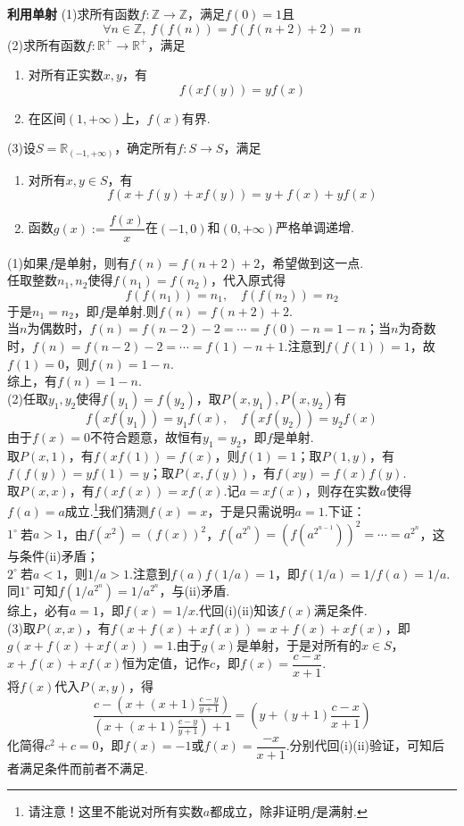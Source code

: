 \documentclass[lang=cn, zihao=5]{elegantbook}
\newcommand{\R}{\mathbb{R}}
\newcommand{\buzhou}[1]{$#1^{\circ} \ $}
\newcommand{\examplefont}[1]{\color{mgreen} \textbf{#1}}
\begin{document}
\begin{example}{\examplefont{利用单射}}
	(1)求所有函数$f:\mathbb{Z} \to \mathbb{Z}$，满足$f(0)=1$且$$\forall n \in \mathbb{Z},~ f(f(n))=f(f(n+2)+2)=n$$
	(2)求所有函数$f:\R^+ \to \R^+$，满足
	\begin{enumerate}
		\item 对所有正实数$x,y$，有$$f(xf(y))=yf(x)$$
		\item 在区间$(1,+\infty)$上，$f(x)$有界.
	\end{enumerate}
	(3)设$S=\R _{(-1,+\infty )}$，确定所有$f:S \to S$，满足
	\begin{enumerate}
		\item 对所有$x,y \in S$，有$$f(x+f(y)+xf(y))=y+f(x)+yf(x)$$
		\item 函数$g(x):=\dfrac{f(x)}{x}$在$(-1,0)$和$(0,+\infty)$严格单调递增.
	\end{enumerate}
\end{example}
\begin{solution}
	(1)如果$f$是单射，则有$f(n)=f(n+2)+2$，希望做到这一点. \\
	任取整数$n_1,n_2$使得$f(n_1)=f(n_2)$，代入原式得$$f(f(n_1))=n_1,\quad f(f(n_2))=n_2$$
	于是$n_1=n_2$，即$f$是单射.则$f(n)=f(n+2)+2$. \\
	当$n$为偶数时，$f(n)=f(n-2)-2=\cdots =f(0)-n=1-n$；当$n$为奇数时，$f(n)=f(n-2)-2=\cdots =f(1)-n+1$.注意到$f(f(1))=1$，故$f(1)=0$，则$f(n)=1-n$. \\
	综上，有$f(n)=1-n$. \\
	(2)任取$y_1,y_2$使得$f(y_1)=f(y_2)$，取$P(x,y_1),P(x,y_2)$有$$f(xf(y_1))=y_1f(x),\quad f(xf(y_2))=y_2f(x)$$
	由于$f(x)=0$不符合题意，故恒有$y_1=y_2$，即$f$是单射. \\
	取$P(x,1)$，有$f(xf(1))=f(x)$，则$f(1)=1$；取$P(1,y)$，有$f(f(y))=yf(1)=y$；取$P(x,f(y))$，有$f(xy)=f(x)f(y)$. \\
	取$P(x,x)$，有$f(xf(x))=xf(x)$.记$a=xf(x)$，则存在实数$a$使得$f(a)=a$成立.\footnote{请注意！这里不能说对所有实数$a$都成立，除非证明$f$是满射.}我们猜测$f(x)=x$，于是只需说明$a=1$.下证： \\
	\buzhou{1}若$a>1$，由$f(x^2)=(f(x))^2$，$f(a^{2^n})=(f(a^{2^{n-1}}))^2=\cdots = a^{2^n}$，这与条件(ii)矛盾； \\
	\buzhou{2}若$a<1$，则$1/a>1$.注意到$f(a)f(1/a)=1$，即$f(1/a)=1/f(a)=1/a$.同\buzhou{1}可知$f(1/a^{2^n})=1/a^{2^n}$，与(ii)矛盾. \\
	综上，必有$a=1$，即$f(x)=1/x$.代回(i)(ii)知该$f(x)$满足条件. \\
	(3)取$P(x,x)$，有$f(x+f(x)+xf(x))=x+f(x)+xf(x)$，即$g(x+f(x)+xf(x))=1$.由于$g(x)$是单射，于是对所有的$x \in S$，$x+f(x)+xf(x)$恒为定值，记作$c$，即$f(x)=\dfrac{c-x}{x+1}$. \\
	将$f(x)$代入$P(x,y)$，得$$\frac{c-(x+(x+1)\frac{c-y}{y+1})}{(x+(x+1)\frac{c-y}{y+1})+1} = (y+(y+1)\frac{c-x}{x+1})$$
	化简得$c^2+c=0$，即$f(x)=-1$或$f(x)=\dfrac{-x}{x+1}$.分别代回(i)(ii)验证，可知后者满足条件而前者不满足.
\end{solution}
\end{document}
